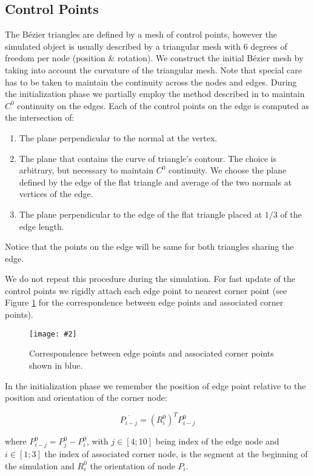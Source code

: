 \documentclass{egpubl}
\newcommand{\Figure}[3]{%
\begin{figure}[htb]
  \centering
  \texttt{[image: \#2]}
  \caption{\label{fig-#2}#3}
\end{figure}}
\begin{document}

\subsection{Control Points} %

The B\'ezier triangles are defined by a mesh of control points, however the
simulated object is usually described by a triangular mesh with 6 degrees of freedom per node (position \& rotation).
We construct
the initial B\'ezier mesh by taking into account the curvature of the triangular
mesh. Note that special care has to be taken to maintain
the continuity across the nodes and edges. During the initialization phase
we partially employ the method described in \cite{Ubach2010} to maintain
$C^0$ continuity on the edges. Each of the control points on the edge is
computed as the intersection of:

\begin{enumerate}
    \item The plane perpendicular to the normal at the vertex.
    \item The plane that contains the curve of triangle's contour. The
        choice is arbitrary, but necessary to maintain $C^0$ continuity. 
        We choose the plane defined by the edge of the flat triangle and
        average of the two normals at vertices of the edge. 
    \item The plane perpendicular to the edge of the flat triangle placed at
        $1/3$ of the edge length.
\end{enumerate}

Notice that the points on the edge will be same for both triangles sharing
the edge.

We do not repeat this procedure during the simulation. For fast update of
the control points we rigidly attach each edge point to nearest corner point (see Figure
\ref{fig-segments} for the correspondence between edge points and
associated corner points).

\Figure{0.8\linewidth}{segments}
{Correspondence between edge points and associated corner points shown in
blue.}

In the initialization phase we remember the position of edge point relative to the position and orientation of the corner node:

\begin{equation}
    \overline{P_{i-j}} = (R_i^0)^T P_{i-j}^0
\end{equation}

\noindent
where $P_{i-j}^0 = P_j^0 - P_i^0$, with $j \in [4;10]$ being index of the edge node and $i \in [1;3]$ the index of associated corner node, is the segment at the beginning of the simulation and $R_i^0$ the orientation of node $P_i$.
\end{document}
